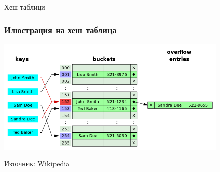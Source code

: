 \documentclass{beamer}
\begin{document}
\begin{frame}
\centerline{Хеш таблици}
\end{frame}



\begin{frame}[fragile]
\frametitle{Илюстрация на хеш таблица}
\begin{center}
\includegraphics[width=11cm]{images/hast1}
  
\end{center}
\begin{center}
Източник: Wikipedia
\end{center}
\end{frame}
\end{document}
